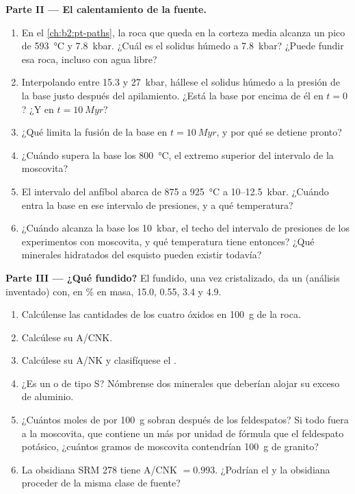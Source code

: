 \begin{problem}
\noindent\textbf{Parte II --- El calentamiento de la fuente.}
\begin{enumerate}[resume]
\item En el \cref{ch:b2:pt-paths}, la roca que queda en la corteza media alcanza un pico de \qty{593}{\celsius}
y \qty{7.8}{kbar}. ¿Cuál es el solidus húmedo a \qty{7.8}{kbar}? ¿Puede fundir esa roca, incluso
con agua libre?
\item Interpolando entre 15.3 y \qty{27}{kbar}, hállese el solidus húmedo a la presión
de la base justo después del apilamiento. ¿Está la base por encima de él en $t = 0$? ¿Y en $t = \qty{10}{Myr}$?
\item ¿Qué limita la fusión de la base en $t = \qty{10}{Myr}$, y por qué se detiene
pronto?
\item ¿Cuándo supera la base los \qty{800}{\celsius}, el extremo superior del intervalo de la
moscovita?
\item El intervalo del anfíbol abarca de 875 a \qty{925}{\celsius} a 10--\qty{12.5}{kbar}.
¿Cuándo entra la base en ese intervalo de presiones, y a qué temperatura?
\item ¿Cuándo alcanza la base los \qty{10}{kbar}, el techo del intervalo de presiones de los
experimentos con moscovita, y qué temperatura tiene entonces? ¿Qué minerales hidratados del esquisto pueden
existir todavía?
\end{enumerate}

\noindent\textbf{Parte III --- ¿Qué fundido?}
El fundido, una vez cristalizado, da un  (análisis inventado) con, en
\unit{\percent} en masa,  15.0,  0.55,  3.4 y  4.9.
\begin{enumerate}[resume]
\item Calcúlense las cantidades de los cuatro óxidos en \qty{100}{\gram} de la roca.
\item Calcúlese su A/CNK.
\item Calcúlese su A/NK y clasifíquese el .
\item ¿Es un  o de tipo S? Nómbrense dos minerales que deberían alojar su exceso
de aluminio.
\item ¿Cuántos moles de  por \qty{100}{\gram} sobran después de los
feldespatos? Si todo fuera a la moscovita, que contiene un  más por unidad
de fórmula que el feldespato potásico, ¿cuántos gramos de moscovita contendrían
\qty{100}{\gram} de granito?
\item La obsidiana SRM 278 tiene A/CNK $= 0.993$. ¿Podrían el  y la obsidiana
proceder de la misma clase de fuente?
\end{enumerate}


\end{problem}
